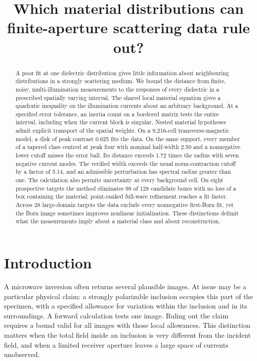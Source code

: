 \documentclass[anonymous,12pt]{iopjournal}
\numberwithin{equation}{section}
\begin{document}
\par\vspace{1.8ex}
\title{Which material distributions can finite-aperture scattering data rule out?}
\author{}
\begin{abstract}
A poor fit at one dielectric distribution gives little information about neighbouring distributions in a strongly scattering medium. We bound the distance from finite, noisy, multi-illumination measurements to the responses of every dielectric in a prescribed spatially varying interval. The shared local material equation gives a quadratic inequality on the illumination currents about an arbitrary background. At a specified error tolerance, an inertia count on a bordered matrix tests the entire interval, including when the current block is singular. Nested material hypotheses admit explicit transport of the spatial weights. On a 9,216-cell transverse-magnetic model, a disk of peak contrast 0.625 fits the data. On the same support, every member of a tapered class centred at peak four with nominal half-width 2.50 and a nonnegative lower cutoff misses the error ball. Its distance exceeds 1.72 times the radius with seven negative current modes. The verified width exceeds the usual norm-contraction cutoff by a factor of 5.14, and an admissible perturbation has spectral radius greater than one. The calculation also permits uncertainty at every background cell. On eight prospective targets the method eliminates 98 of 128 candidate boxes with no loss of a box containing the material; point-ranked full-wave refinement reaches a fit faster. Across 28 large-domain targets the data exclude every nonnegative first-Born fit, yet the Born image sometimes improves nonlinear initialization. These distinctions delimit what the measurements imply about a material class and about reconstruction.
\end{abstract}
\section{Introduction}

A microwave inversion often returns several plausible images. At issue may be a particular physical claim: a strongly polarizable inclusion occupies this part of the specimen, with a specified allowance for variation within the inclusion and in its surroundings. A forward calculation tests one image. Ruling out the claim requires a bound valid for all images with those local allowances. This distinction matters when the total field inside an inclusion is very different from the incident field, and when a limited receiver aperture leaves a large space of currents unobserved.
\end{document}
